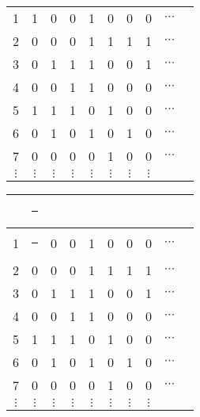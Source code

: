 \documentclass[compress,17pt]{beamer}
\newcommand\hl{\bgroup\markoverwith
    {\textcolor{yellow}{\rule[-.5ex]{.1pt}{2.5ex}}}\ULon}
\begin{document}
\begin{frame}
  \centering
  \begin{tabular}{ | c | c c c c c c c c c }
    \hline
    &  \\
    \hline

    1 & 1 & 0 & 0 & 1 & 0 & 0 & 0 & $\cdots$\\
    2 & 0 & 0 & 0 & 1 & 1 & 1 & 1 & $\cdots$\\
    3 & 0 & 1 & 1 & 1 & 0 & 0 & 1 & $\cdots$\\
    4 & 0 & 0 & 1 & 1 & 0 & 0 & 0 & $\cdots$\\
    5 & 1 & 1 & 1 & 0 & 1 & 0 & 0 & $\cdots$\\
    6 & 0 & 1 & 0 & 1 & 0 & 1 & 0 & $\cdots$\\
    7 & 0 & 0 & 0 & 0 & 1 & 0 & 0 & $\cdots$\\
    $\vdots$ & $\vdots$ & $\vdots$ & $\vdots$ & $\vdots$ & $\vdots$ & $\vdots$ & $\vdots$ & \\
  \end{tabular}
\end{frame}

\begin{frame}
  \centering
  \begin{tabular}{ | c | c c c c c c c c c }
    \hline
    &  \hl 0 \\
    \hline

    1 & \hl 1 & 0 & 0 & 1 & 0 & 0 & 0 & $\cdots$\\
    2 & 0 & 0 & 0 & 1 & 1 & 1 & 1 & $\cdots$\\
    3 & 0 & 1 & 1 & 1 & 0 & 0 & 1 & $\cdots$\\
    4 & 0 & 0 & 1 & 1 & 0 & 0 & 0 & $\cdots$\\
    5 & 1 & 1 & 1 & 0 & 1 & 0 & 0 & $\cdots$\\
    6 & 0 & 1 & 0 & 1 & 0 & 1 & 0 & $\cdots$\\
    7 & 0 & 0 & 0 & 0 & 1 & 0 & 0 & $\cdots$\\
    $\vdots$ & $\vdots$ & $\vdots$ & $\vdots$ & $\vdots$ & $\vdots$ & $\vdots$ & $\vdots$ & \\
  \end{tabular}
\end{frame}
\end{document}
